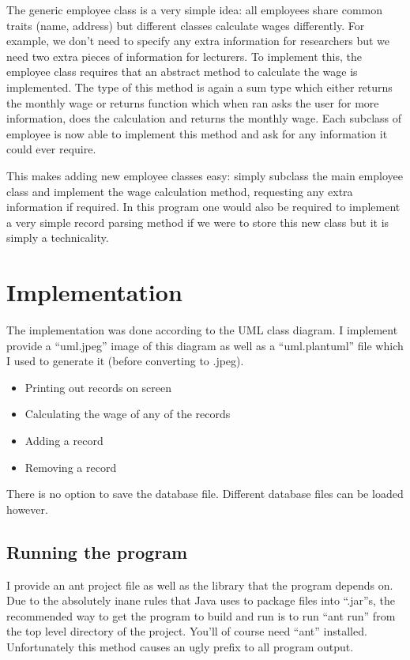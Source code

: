 \documentclass{report}
\begin{document}
The generic employee class is a very simple idea: all employees share
common traits (name, address) but different classes calculate wages
differently. For example, we don't need to specify any extra
information for researchers but we need two extra pieces of
information for lecturers. To implement this, the employee class
requires that an abstract method to calculate the wage is implemented.
The type of this method is again a sum type which either returns the
monthly wage or returns function which when ran asks the user for more
information, does the calculation and returns the monthly wage. Each
subclass of employee is now able to implement this method and ask for
any information it could ever require.

This makes adding new employee classes easy: simply subclass the main
employee class and implement the wage calculation method, requesting
any extra information if required. In this program one would also be
required to implement a very simple record parsing method if we were
to store this new class but it is simply a technicality.

\section*{Implementation}
The implementation was done according to the UML class diagram. I
implement provide a ``uml.jpeg''  image of this diagram as well as a
``uml.plantuml'' file which I used to generate it (before converting
to .jpeg).
\begin{itemize}
  \item{Printing out records on screen}
  \item{Calculating the wage of any of the records}
  \item{Adding a record}
  \item{Removing a record}
\end{itemize}

There is no option to save the database file. Different database files
can be loaded however.

\subsection*{Running the program}
I provide an ant project file as well as the library that the program
depends on. Due to the absolutely inane rules that Java uses to
package files into ``.jar''s, the recommended way to get the program
to build and run is to run ``ant run'' from the top level directory of
the project. You'll of course need ``ant'' installed. Unfortunately
this method causes an ugly prefix to all program output.
\end{document}
